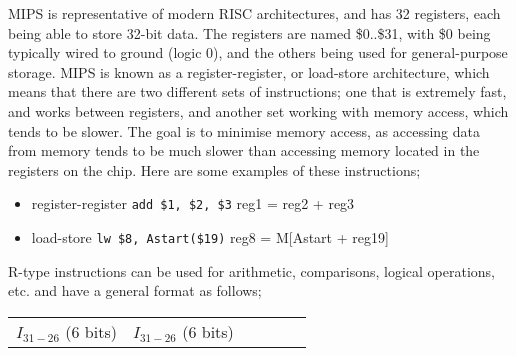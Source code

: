 \documentclass[a4paper, 12pt]{article}
\begin{document}
            MIPS is representative of modern RISC architectures, and has 32 registers, each being able to store 32-bit data. The registers are named \$0..\$31, with \$0 being typically wired to ground (logic 0), and the others being used for general-purpose storage. MIPS is known as a register-register, or load-store architecture, which means that there are two different sets of instructions; one that is extremely fast, and works between registers, and another set working with memory access, which tends to be slower. The goal is to minimise memory access, as accessing data from memory tends to be much slower than accessing memory located in the registers on the chip. Here are some examples of these instructions;
            \begin{itemize}
                \itemsep0em
                \item register-register
                    \subitem \texttt{add \$1, \$2, \$3} \hfill reg1 = reg2 + reg3
                \item load-store
                    \subitem \texttt{lw \$8, Astart(\$19)} \hfill reg8 = M[Astart + reg19]
            \end{itemize}
            R-type instructions can be used for arithmetic, comparisons, logical operations, etc. and have a general format as follows;
            \begin{center}
                \begin{tabular}{c|c|c|c|c|c}
                    $I_{31-26}$ (6 bits) & $I_{31-26}$ (6 bits)
                \end{tabular}
            \end{center}
\end{document}
